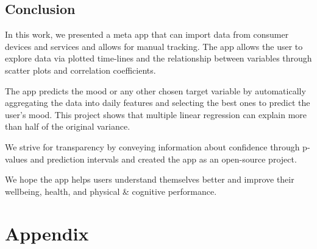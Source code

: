 \documentclass[conference]{IEEEtran}
\begin{document}
\subsection{Conclusion}
In this work, we presented a meta app that can import data from consumer devices and services and allows for manual tracking. The app allows the user to explore data via plotted time-lines and the relationship between variables through scatter plots and correlation coefficients.

The app predicts the mood or any other chosen target variable by automatically aggregating the data into daily features and selecting the best ones to predict the user's mood.
This project shows that multiple linear regression can explain more than half of the original variance.

We strive for transparency by conveying information about confidence through p-values and prediction intervals and created the app as an open-source project.

We hope the app helps users understand themselves better and improve their wellbeing, health, and physical \& cognitive performance.










\section{Appendix}
\label{sec:Appendix}
\end{document}
